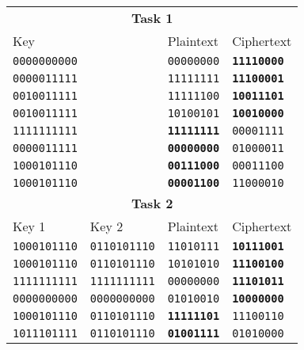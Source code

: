 \documentclass[a4paper,english,12pt]{article}
\begin{document}
\begin{table}
  \centering
  \begin{tabular}{@{}llll@{}}
    \toprule
    \multicolumn{4}{c}{\textbf{Task 1}} \\
    Key & &
    Plaintext &
    Ciphertext \\
    \midrule
    \texttt{0000000000} & & \texttt{00000000} & \texttt{\textbf{11110000}} \\
    \texttt{0000011111} & & \texttt{11111111} & \texttt{\textbf{11100001}} \\
    \texttt{0010011111} & & \texttt{11111100} & \texttt{\textbf{10011101}} \\
    \texttt{0010011111} & & \texttt{10100101} & \texttt{\textbf{10010000}} \\
    \texttt{1111111111} & & \texttt{\textbf{11111111}} & \texttt{00001111} \\
    \texttt{0000011111} & & \texttt{\textbf{00000000}} & \texttt{01000011} \\
    \texttt{1000101110} & & \texttt{\textbf{00111000}} & \texttt{00011100} \\
    \texttt{1000101110} & & \texttt{\textbf{00001100}} & \texttt{11000010} \\
    \toprule
    \multicolumn{4}{c}{\textbf{Task 2}} \\
      Key 1 &
      Key 2 &
      Plaintext &
      Ciphertext \\
    \midrule
             \texttt{1000101110} &
             \texttt{0110101110} &
               \texttt{11010111} &
       \texttt{\textbf{10111001}} \\

            \texttt{1000101110} &
            \texttt{0110101110} &
              \texttt{10101010} &
      \texttt{\textbf{11100100}} \\

            \texttt{1111111111} &
            \texttt{1111111111} &
              \texttt{00000000} &
      \texttt{\textbf{11101011}} \\

            \texttt{0000000000} &
            \texttt{0000000000} &
              \texttt{01010010} &
      \texttt{\textbf{10000000}} \\

            \texttt{1000101110} &
            \texttt{0110101110} &
      \texttt{\textbf{11111101}} &
              \texttt{11100110} \\

             \texttt{1011101111} &
             \texttt{0110101110} &
       \texttt{\textbf{01001111}} &
               \texttt{01010000} \\


\end{tabular}
\end{table}
\end{document}

